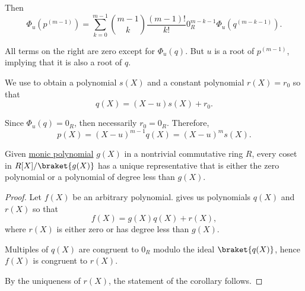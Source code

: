 \begin{defproof}
  Then
  \begin{equation*}
    \Phi_u(p^{(m-1)}) = \sum_{k=0}^{m-1} \binom {m-1} k \frac {(m - 1)!} {k!} 0_R^{m - k - 1} \Phi_u(q^{(m - k - 1)}).
  \end{equation*}

  All terms on the right are zero except for \( \Phi_u(q) \). But \( u \) is a root of \( p^{(m-1)} \), implying that it is also a root of \( q \).

  We use  to obtain a polynomial \( s(X) \) and a constant polynomial \( r(X) = r_0 \) so that
  \begin{equation*}
    q(X) = (X - u) s(X) + r_0.
  \end{equation*}

  Since \( \Phi_u(q) = 0_R \), then necessarily \( r_0 = 0_R \). Therefore,
  \begin{equation*}
    p(X) = (X - u)^{m-1} q(X) = (X - u)^m s(X).
  \end{equation*}
\end{defproof}

\begin{definition}\label{def:multivariate_polynomial_root}

\end{definition}

\begin{proposition}\label{thm:representatives_in_univariate_polynomial_quotient_set}
  Given \hyperref[def:monic_polynomial]{monic polynomial} \( g(X) \) in a nontrivial commutative ring \( R \), every coset in \( R[X] / \braket{ g(X) } \) has a unique representative that is either the zero polynomial or a polynomial of degree less than \( g(X) \).
\end{proposition}
\begin{proof}
  Let \( f(X) \) be an arbitrary polynomial.  gives us polynomials \( q(X) \) and \( r(X) \) so that
  \begin{equation*}
    f(X) = g(X) q(X) + r(X),
  \end{equation*}
  where \( r(X) \) is either zero or has degree less than \( g(X) \).

  Multiples of \( q(X) \) are congruent to \( 0_R \) modulo the ideal \( \braket{ q(X) } \), hence \( f(X) \) is congruent to \( r(X) \).

  By the uniqueness of \( r(X) \), the statement of the corollary follows.
\end{proof}

